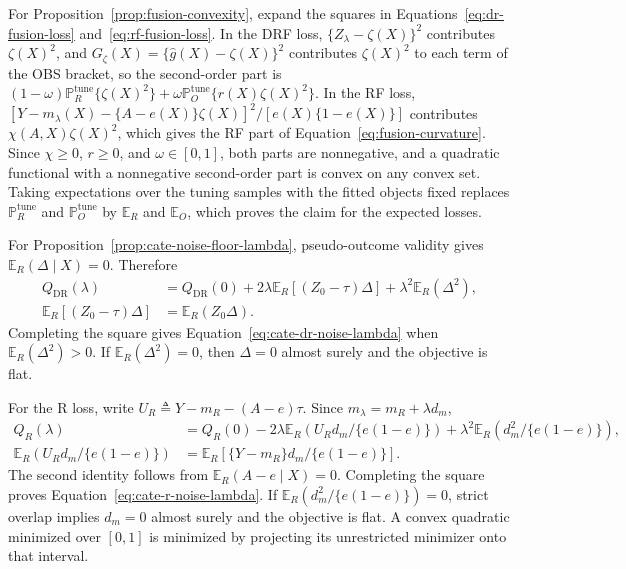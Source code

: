 For Proposition~\ref{prop:fusion-convexity}, expand the squares in Equations~\eqref{eq:dr-fusion-loss} and~\eqref{eq:rf-fusion-loss}. In the DRF loss, $\{Z_\lambda-\zeta(X)\}^2$ contributes $\zeta(X)^2$, and $G_\zeta(X)=\{\widehat g(X)-\zeta(X)\}^2$ contributes $\zeta(X)^2$ to each term of the OBS bracket, so the second-order part is $(1-\omega)\mathbb P_R^{\mathrm{tune}}\{\zeta(X)^2\}+\omega\mathbb P_O^{\mathrm{tune}}\{r(X)\zeta(X)^2\}$. In the RF loss, $[Y-m_\lambda(X)-\{A-e(X)\}\zeta(X)]^2/[e(X)\{1-e(X)\}]$ contributes $\chi(A,X)\zeta(X)^2$, which gives the RF part of Equation~\eqref{eq:fusion-curvature}. Since $\chi\geq0$, $r\geq0$, and $\omega\in[0,1]$, both parts are nonnegative, and a quadratic functional with a nonnegative second-order part is convex on any convex set. Taking expectations over the tuning samples with the fitted objects fixed replaces $\mathbb P_R^{\mathrm{tune}}$ and $\mathbb P_O^{\mathrm{tune}}$ by $\mathbb E_R$ and $\mathbb E_O$, which proves the claim for the expected losses.

For Proposition~\ref{prop:cate-noise-floor-lambda}, pseudo-outcome validity
gives $\mathbb E_R(\Delta\mid X)=0$.  Therefore
\begin{align*}
Q_{\mathrm{DR}}(\lambda)
&=Q_{\mathrm{DR}}(0)
+2\lambda\mathbb E_R[(Z_0-\tau)\Delta]
+\lambda^2\mathbb E_R(\Delta^2),\\
\mathbb E_R[(Z_0-\tau)\Delta]
&=\mathbb E_R(Z_0\Delta).
\end{align*}
Completing the square gives Equation~\eqref{eq:cate-dr-noise-lambda} when
$\mathbb E_R(\Delta^2)>0$.  If $\mathbb E_R(\Delta^2)=0$, then
$\Delta=0$ almost surely and the objective is flat.

For the R loss, write
$U_R\triangleq Y-m_R-(A-e)\tau$.  Since
$m_\lambda=m_R+\lambda d_m$,
\begin{align*}
Q_R(\lambda)
&=Q_R(0)
-2\lambda\mathbb E_R(U_Rd_m/\{e(1-e)\})
+\lambda^2\mathbb E_R(d_m^2/\{e(1-e)\}),\\
\mathbb E_R(U_Rd_m/\{e(1-e)\})
&=\mathbb E_R[\{Y-m_R\}d_m/\{e(1-e)\}].
\end{align*}
The second identity follows from
$\mathbb E_R(A-e\mid X)=0$.  Completing the square proves
Equation~\eqref{eq:cate-r-noise-lambda}.  If
$\mathbb E_R(d_m^2/\{e(1-e)\})=0$, strict overlap implies $d_m=0$ almost surely
and the objective is flat.  A convex
quadratic minimized over $[0,1]$ is minimized by projecting its
unrestricted minimizer onto that interval.


